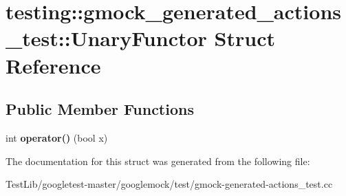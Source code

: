 \hypertarget{structtesting_1_1gmock__generated__actions__test_1_1UnaryFunctor}{}\section{testing\+:\+:gmock\+\_\+generated\+\_\+actions\+\_\+test\+:\+:Unary\+Functor Struct Reference}
\label{structtesting_1_1gmock__generated__actions__test_1_1UnaryFunctor}
\subsection*{Public Member Functions}
\begin{DoxyCompactItemize}
\item 
\mbox{\label{structtesting_1_1gmock__generated__actions__test_1_1UnaryFunctor_aeae4c0025faeac92845d652b35ac2846}} 
int {\bfseries operator()} (bool x)
\end{DoxyCompactItemize}


The documentation for this struct was generated from the following file\+:\begin{DoxyCompactItemize}
\item 
Test\+Lib/googletest-\/master/googlemock/test/gmock-\/generated-\/actions\+\_\+test.\+cc\end{DoxyCompactItemize}
